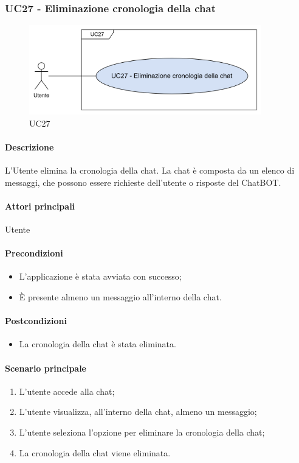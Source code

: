 \subsubsection{UC27 - Eliminazione cronologia della chat}\label{UC27}

\begin{figure}[H]
  \centering
  \includegraphics[width=0.90\textwidth]{assets/uc27.png}
  \caption{UC27}
\end{figure}

\paragraph*{Descrizione}
L'Utente elimina la cronologia della chat. La chat è composta da un elenco di messaggi, che possono essere richieste dell'utente o risposte del ChatBOT.

\paragraph*{Attori principali}
Utente

\paragraph*{Precondizioni}
\begin{itemize}
  \item L'applicazione è stata avviata con successo;
  \item È presente almeno un messaggio all'interno della chat.
\end{itemize}

\paragraph*{Postcondizioni}
\begin{itemize}
  \item La cronologia della chat è stata eliminata.
\end{itemize}

\paragraph*{Scenario principale}
\begin{enumerate}
  \item L'utente accede alla chat;
  \item L'utente visualizza, all'interno della chat, almeno un messaggio;
  \item L'utente seleziona l'opzione per eliminare la cronologia della chat;
  \item La cronologia della chat viene eliminata.
\end{enumerate}
